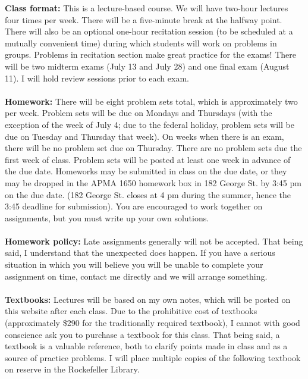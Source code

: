 \documentclass[11pt]{article}
\begin{document}
\textbf {Class format:} This is a lecture-based course. We will have two-hour lectures four times per week. There will be a five-minute break at the halfway point. There will also be an optional one-hour recitation session (to be scheduled at a mutually convenient time) during which students will work on problems in groups. Problems in recitation section make great practice for the exams! There will be two midterm exams (July 13 and July 28) and one final exam (August 11). I will hold review sessions prior to each exam.\\\\
\textbf {Homework: }There will be eight problem sets total, which is approximately two per week. Problem sets will be due on Mondays and Thursdays (with the exception of the week of July 4; due to the federal holiday, problem sets will be due on Tuesday and Thursday that week). On weeks when there is an exam, there will be no problem set due on Thursday. There are no problem sets due the first week of class. Problem sets will be posted at least one week in advance of the due date. Homeworks may be submitted in class on the due date, or they may be dropped in the APMA 1650 homework box in 182 George St. by 3:45 pm on the due date. (182 George St. closes at 4 pm during the summer, hence the 3:45 deadline for submission). You are encouraged to work together on assignments, but you must write up your own solutions.\\\\
\textbf{Homework policy: }Late assignments generally will not be accepted. That being said, I understand that the unexpected does happen. If you have a serious situation in which you will believe you will be unable to complete your assignment on time, contact me directly and we will arrange something.\\\\
\textbf {\large Textbooks:} Lectures will be based on my own notes, which will be posted on this website after each class. Due to the prohibitive cost of textbooks (approximately \$290 for the traditionally required textbook), I cannot with good conscience ask you to purchase a textbook for this class. That being said, a textbook is a valuable reference, both to clarify points made in class and as a source of practice problems. I will place multiple copies of the following textbook on reserve in the Rockefeller Library.
\end{document}
